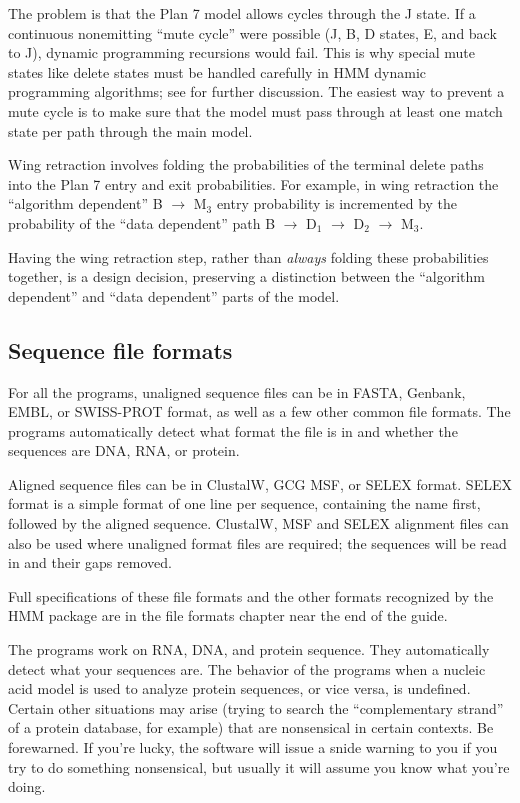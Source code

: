 The problem is that the Plan 7 model allows cycles through the J
state. If a continuous nonemitting ``mute cycle'' were possible (J, B,
D states, E, and back to J), dynamic programming recursions would
fail. This is why special mute states like delete states must be
handled carefully in HMM dynamic programming algorithms; see
\cite{Durbin98} for further discussion. The easiest way to
prevent a mute cycle is to make sure that the model must pass through
at least one match state per path through the main model.

Wing retraction involves folding the probabilities of the terminal
delete paths into the Plan 7 entry and exit probabilities. For
example, in wing retraction the ``algorithm dependent'' B
$\rightarrow$ M$_{3}$ entry probability is incremented by the
probability of the ``data dependent'' path B $\rightarrow$ D$_1$
$\rightarrow$ D$_2$ $\rightarrow$ M$_3$.

Having the wing retraction step, rather than {\em always} folding
these probabilities together, is a design decision, preserving a
distinction between the ``algorithm dependent'' and ``data dependent''
parts of the model.

\subsection{Sequence file formats}

For all the programs, unaligned sequence files can be in FASTA,
Genbank, EMBL, or SWISS-PROT format, as well as a few other common
file formats. The programs automatically detect what format the file
is in and whether the sequences are DNA, RNA, or protein.

Aligned sequence files can be in ClustalW, GCG MSF, or SELEX
format. SELEX format is a simple format of one line per sequence,
containing the name first, followed by the aligned sequence. ClustalW,
MSF and SELEX alignment files can also be used where unaligned format
files are required; the sequences will be read in and their gaps
removed. 

Full specifications of these file formats and the other formats
recognized by the HMM package are in the file formats chapter near the
end of the guide.

The programs work on RNA, DNA, and protein sequence. They
automatically detect what your sequences are. The behavior of the
programs when a nucleic acid model is used to analyze protein
sequences, or vice versa, is undefined. Certain other situations may
arise (trying to search the ``complementary strand'' of a protein
database, for example) that are nonsensical in certain contexts. Be
forewarned. If you're lucky, the software will issue a snide warning
to you if you try to do something nonsensical, but usually it will
assume you know what you're doing.

